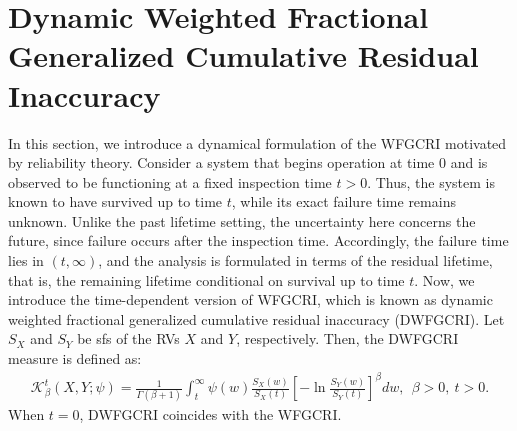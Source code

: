 \documentclass[12pt,a4paper]{article}
\numberwithin{equation}{section}
\begin{document}
\section{Dynamic Weighted Fractional Generalized Cumulative Residual Inaccuracy}
In this section, we introduce a dynamical formulation of the WFGCRI motivated by reliability theory. Consider a system that begins operation at time $0$ and is observed to be functioning at a fixed inspection time $t>0$. Thus, the system is known to have survived up to time $t$, while its exact failure time remains unknown. Unlike the past lifetime setting, the uncertainty here concerns the future, since failure occurs after the inspection time. Accordingly, the failure time lies in $(t,\infty)$, and the analysis is formulated in terms of the residual lifetime, that is, the remaining lifetime conditional on survival up to time $t$.
Now, we introduce the time-dependent version of WFGCRI, which is known as dynamic  weighted  fractional generalized cumulative residual inaccuracy (DWFGCRI).  Let $S_X$ and $S_Y$ be  sfs of the RVs $X$ and $Y$, respectively. Then, the  DWFGCRI measure is defined as: 
\begin{align}\label{eq3.1}
\mathcal K^t_\beta(X,Y;\psi)=\frac{1}{\Gamma(\beta+1)}\int_t^{\infty}\psi(w)\frac{S_X(w)}{S_X(t)}\left[-\ln \frac{S_Y(w)}{S_Y(t)}\right]^\beta dw,~~ \beta>0, ~t>0.
\end{align}
When $t=0$, DWFGCRI coincides with the WFGCRI.
\end{document}
